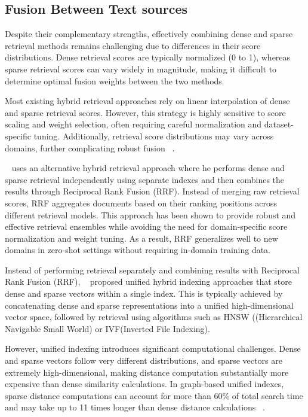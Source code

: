 \subsection{Fusion Between Text sources}
Despite their complementary strengths, effectively combining dense and sparse retrieval methods remains challenging due to differences in their score distributions. Dense retrieval scores are typically normalized (0 to 1), whereas sparse retrieval scores can vary widely in magnitude, making it difficult to determine optimal fusion weights between the two methods.

Most existing hybrid retrieval approaches rely on linear interpolation of dense and sparse retrieval scores. However, this strategy is highly sensitive to score scaling and weight selection, often requiring careful normalization and dataset-specific tuning. Additionally, retrieval score distributions may vary across domains, further complicating robust fusion ~\cite{Wang2021Jul}.

~\citet{Chen2022Jan} uses an alternative hybrid retrieval approach where he performs dense and sparse retrieval independently using separate indexes and then combines the results through Reciprocal Rank Fusion (RRF). Instead of merging raw retrieval scores, RRF aggregates documents based on their ranking positions across different retrieval models. This approach has been shown to provide robust and effective retrieval ensembles while avoiding the need for domain-specific score normalization and weight tuning. As a result, RRF generalizes well to new domains in zero-shot settings without requiring in-domain training data.

Instead of performing retrieval separately and combining results with Reciprocal Rank Fusion (RRF), ~\citet{Zhang2024Oct} proposed unified hybrid indexing approaches that store dense and sparse vectors within a single index. This is typically achieved by concatenating dense and sparse representations into a unified high-dimensional vector space, followed by retrieval using algorithms such as HNSW ((Hierarchical Navigable Small World) or IVF(Inverted File Indexing).

However, unified indexing introduces significant computational challenges. Dense and sparse vectors follow very different distributions, and sparse vectors are extremely high-dimensional, making distance computation substantially more expensive than dense similarity calculations. In graph-based unified indexes, sparse distance computations can account for more than 60\% of total search time and may take up to 11 times longer than dense distance calculations ~\citet{Zhang2024Oct}.

